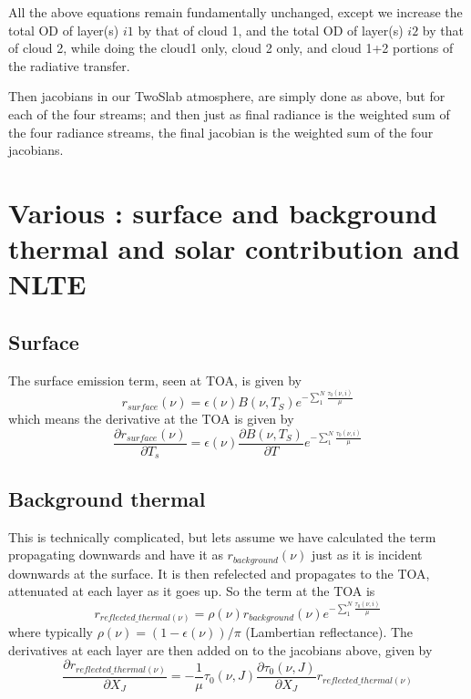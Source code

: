 \documentclass[11pt]{article}
\begin{document}
All the above equations remain fundamentally unchanged, except we \eg
increase the total OD of layer(s) $i1$ by that of cloud 1, and the
total OD of layer(s) $i2$ by that of cloud 2, while doing the cloud1
only, cloud 2 only, and cloud 1+2 portions of the radiative transfer.

Then jacobians in our TwoSlab atmosphere, are simply done as above,
but for each of the four streams; and then just as final radiance is
the weighted sum of the four radiance streams, the final jacobian is
the weighted sum of the four jacobians.

\section{Various : surface and background thermal and solar contribution and NLTE}

\subsection{Surface}
The surface emission term, seen at TOA, is given by
\[
r_{surface}(\nu) = \epsilon(\nu) B(\nu,T_S) e^{-\sum_1^N \frac{\tau_0(\nu,i)}{\mu}}
\]
which means the derivative at the TOA is given by 
\[
\frac{\partial r_{surface}(\nu)}{\partial T_s} = \epsilon(\nu) \frac{\partial B(\nu,T_S)}{\partial T} e^{-\sum_1^N \frac{\tau_0(\nu,i)}{\mu}}
\]

\subsection{Background thermal}
This is technically complicated, but lets assume we have calculated
the term propagating downwards and have it as $r_{background}(\nu)$
just as it is incident downwards at the surface. It is then refelected
and propagates to the TOA, attenuated at each layer as it goes up. So
the term at the TOA is 
\[
r_{reflected\_thermal(\nu)} = \rho(\nu) r_{background}(\nu) e^{-\sum_1^N \frac{\tau_0(\nu,i)}{\mu}}
\]
where typically $\rho(\nu) = (1-\epsilon(\nu))/\pi$ (Lambertian
reflectance). The derivatives at each layer are then added on to the jacobians above, given by
\[
\frac{\partial r_{reflected\_thermal(\nu)}}{\partial X_J} = -\frac{1}{\mu} \tau_0(\nu,J) \frac{\partial \tau_0(\nu,J)}{\partial X_J}r_{reflected\_thermal(\nu)}
\]
\end{document}
